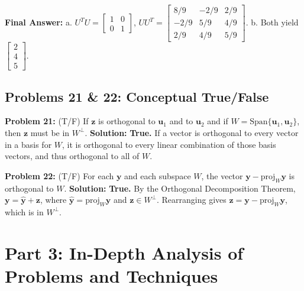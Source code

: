 \documentclass[11pt, letterpaper]{article}
\theoremstyle{definition}
\theoremstyle{remark}
\begin{document}
\textbf{Final Answer:} 
a. $U^T U = \begin{bmatrix} 1 & 0 \\ 0 & 1 \end{bmatrix}$, $U U^T = \begin{bmatrix} 8/9 & -2/9 & 2/9 \\ -2/9 & 5/9 & 4/9 \\ 2/9 & 4/9 & 5/9 \end{bmatrix}$. 
b. Both yield $\begin{bmatrix} 2 \\ 4 \\ 5 \end{bmatrix}$.

\vspace{1em}
\subsection{Problems 21 \& 22: Conceptual True/False}
\textbf{Problem 21:} (T/F) If $\mathbf{z}$ is orthogonal to $\mathbf{u}_1$ and to $\mathbf{u}_2$ and if $W = \text{Span}\{\mathbf{u}_1, \mathbf{u}_2\}$, then $\mathbf{z}$ must be in $W^\perp$.
\textbf{Solution:} \textbf{True.} If a vector is orthogonal to every vector in a basis for $W$, it is orthogonal to every linear combination of those basis vectors, and thus orthogonal to all of $W$.

\textbf{Problem 22:} (T/F) For each $\mathbf{y}$ and each subspace $W$, the vector $\mathbf{y} - \text{proj}_W \mathbf{y}$ is orthogonal to $W$.
\textbf{Solution:} \textbf{True.} By the Orthogonal Decomposition Theorem, $\mathbf{y} = \hat{\mathbf{y}} + \mathbf{z}$, where $\hat{\mathbf{y}} = \text{proj}_W \mathbf{y}$ and $\mathbf{z} \in W^\perp$. Rearranging gives $\mathbf{z} = \mathbf{y} - \text{proj}_W \mathbf{y}$, which is in $W^\perp$.

\newpage
\section{Part 3: In-Depth Analysis of Problems and Techniques}
\end{document}
